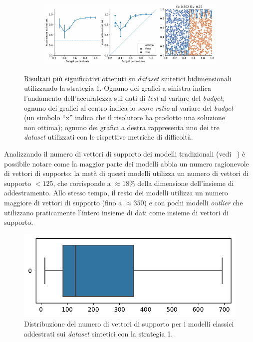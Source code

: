 \begin{figure}[ht]
    \hfill
    \begin{subfigure}{\textwidth}
        \centering
        \includegraphics[width=.8\textwidth]{img/2d/15.pdf}
    \end{subfigure}%
    \caption[Risultati su \emph{dataset} sintetici utilizzando la strategia 1.]{Risultati più significativi ottenuti su \emph{dataset} sintetici bidimensionali utilizzando la strategia 1. Ognuno dei grafici a sinistra indica l'andamento dell'accuratezza sui dati di \emph{test} al variare del \emph{budget}; ognuno dei grafici al centro indica lo \emph{score ratio} al variare del \emph{budget} (un simbolo ``x'' indica che il risolutore ha prodotto una soluzione non ottima); ognuno dei grafici a destra rappresenta uno dei tre \emph{dataset} utilizzati con le rispettive metriche di difficoltà.}
\label{fig:risultati_2d}
\end{figure}


Analizzando il numero di vettori di supporto dei modelli tradizionali (vedi ~) è possibile notare come la maggior parte dei modelli abbia un numero ragionevole di vettori di supporto:
la metà di questi modelli utilizza un numero di vettori di supporto $<125$, che corrisponde a $\approx18\%$ della dimensione dell'insieme di addestramento. 
Allo stesso tempo, il resto dei modelli utilizza un numero maggiore di vettori di supporto (fino a $\approx350$) e con pochi modelli \emph{outlier} che utilizzano praticamente l'intero insieme di dati come insieme di vettori di supporto.
\begin{figure}
    \centering
    \includegraphics[width=0.5\linewidth]{img/2d/numsv.pdf}
    \caption{Distribuzione del numero di vettori di supporto per i modelli classici addestrati sui \emph{dataset} sintetici con la strategia 1.}
    \label{fig:2d_dist_numsv}
\end{figure}

